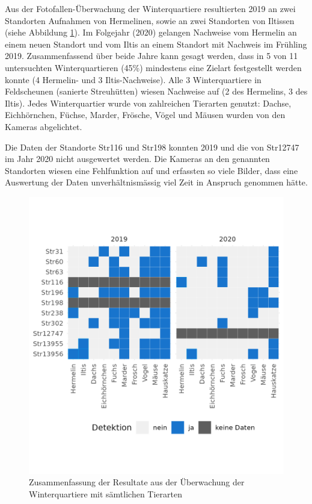 \documentclass[
  oneside]{scrbook}
\begin{document}
Aus der Fotofallen-Überwachung der Winterquartiere resultierten 2019 an zwei Standorten Aufnahmen von Hermelinen, sowie an zwei Standorten von Iltissen (siehe Abbildung \ref{fig:winterquartiereresultate}). Im Folgejahr (2020) gelangen Nachweise vom Hermelin an einem neuen Standort und vom Iltis an einem Standort mit Nachweis im Frühling 2019. Zusammenfassend über beide Jahre kann gesagt werden, dass in 5 von 11 untersuchten Winterquartieren (45\%) mindestens eine Zielart festgestellt werden konnte (4 Hermelin- und 3 Iltis-Nachweise). Alle 3 Winterquartiere in Feldscheunen (sanierte Streuhütten) wiesen Nachweise auf (2 des Hermelins, 3 des Iltis).
Jedes Winterquartier wurde von zahlreichen Tierarten genutzt: Dachse, Eichhörnchen, Füchse, Marder, Frösche, Vögel und Mäusen wurden von den Kameras abgelichtet.

Die Daten der Standorte Str116 und Str198 konnten 2019 und die von Str12747 im Jahr 2020 nicht ausgewertet werden. Die Kameras an den genannten Standorten wiesen eine Fehlfunktion auf und erfassten so viele Bilder, dass eine Auswertung der Daten unverhältnismässig viel Zeit in Anspruch genommen hätte.



\begin{figure}
\includegraphics[width=1\linewidth]{images/winterquartiere_resultate} \caption{Zusammenfassung der Resultate aus der Überwachung der Winterquartiere mit sämtlichen Tierarten}\label{fig:winterquartiereresultate}
\end{figure}
\end{document}
